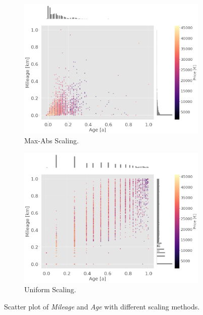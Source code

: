 \begin{figure}
\begin{subfigure}[b]{0.48\textwidth}
        \includegraphics[width=\textwidth]{"content/pics/Scatter_MaxAbs.png"}
        \caption{Max-Abs Scaling.}
    \end{subfigure}
    \hfill
    \begin{subfigure}[b]{0.48\textwidth}
        \centering
        \includegraphics[width=\textwidth]{"content/pics/Scatter_Uniform.png"}
        \caption{Uniform Scaling.}
    \end{subfigure}
    \caption{Scatter plot of \textit{Mileage} and \textit{Age} with different scaling methods.}
    \label{fig:Scaling}
\end{figure}

